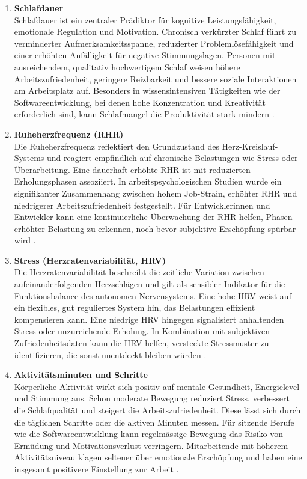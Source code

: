 \documentclass[12pt,a4paper]{report}
\begin{document}
\begin{enumerate}
  \item \textbf{Schlafdauer}\\
        Schlafdauer ist ein zentraler Prädiktor für kognitive Leistungsfähigkeit, emotionale Regulation und Motivation. Chronisch 
        verkürzter Schlaf führt zu verminderter Aufmerksamkeitsspanne, reduzierter Problemlösefähigkeit und einer erhöhten 
        Anfälligkeit für negative Stimmungslagen. Personen mit ausreichendem, qualitativ hochwertigem Schlaf weisen höhere
        Arbeitszufriedenheit, geringere Reizbarkeit und bessere soziale Interaktionen am Arbeitsplatz auf. Besonders in
        wissensintensiven Tätigkeiten wie der Softwareentwicklung, bei denen hohe Konzentration und Kreativität erforderlich sind,
        kann Schlafmangel die Produktivität stark mindern \cite{opoku_sleep_2023}.

  \item \textbf{Ruheherzfrequenz (RHR)}\\
        Die Ruheherzfrequenz reflektiert den Grundzustand des Herz-Kreislauf-Systems und reagiert empfindlich auf chronische 
        Belastungen wie Stress oder Überarbeitung. Eine dauerhaft erhöhte RHR ist mit  reduzierten Erholungsphasen assoziiert.
        In arbeitspsychologischen Studien wurde ein signifikanter Zusammenhang zwischen hohem Job-Strain, erhöhter RHR
        und niedrigerer Arbeitszufriedenheit festgestellt. Für Entwicklerinnen und Entwickler kann eine kontinuierliche Überwachung der RHR
        helfen, Phasen erhöhter Belastung zu erkennen, noch bevor subjektive Erschöpfung spürbar wird \cite{eriksson_rhr_2016}.

  \item \textbf{Stress (Herzratenvariabilität, HRV)}\\
        Die Herzratenvariabilität beschreibt die zeitliche Variation zwischen aufeinanderfolgenden Herzschlägen und gilt als
        sensibler Indikator für die Funktionsbalance des autonomen Nervensystems. Eine hohe HRV weist auf ein flexibles, gut
        reguliertes System hin, das Belastungen effizient kompensieren kann. Eine niedrige HRV hingegen signalisiert anhaltenden
        Stress oder unzureichende Erholung. In Kombination mit subjektiven Zufriedenheitsdaten kann die HRV helfen, versteckte
        Stressmuster zu identifizieren, die sonst unentdeckt bleiben würden \cite{borchini_hrv_2012}.

  \item \textbf{Aktivitätsminuten und Schritte}\\
        Körperliche Aktivität wirkt sich positiv auf mentale Gesundheit, Energielevel und Stimmung aus. Schon moderate Bewegung
        reduziert Stress, verbessert die Schlafqualität und steigert die Arbeitszufriedenheit. Diese lässt sich durch die täglichen
        Schritte oder die aktiven Minuten messen. Für sitzende Berufe wie die Softwareentwicklung kann regelmässige Bewegung das
        Risiko von Ermüdung und Motivationsverlust verringern. Mitarbeitende mit höherem Aktivitätsniveau klagen seltener über
        emotionale Erschöpfung und haben eine insgesamt positivere Einstellung zur Arbeit \cite{dallmeyer_activity_2023}.
\end{enumerate}
\end{document}
